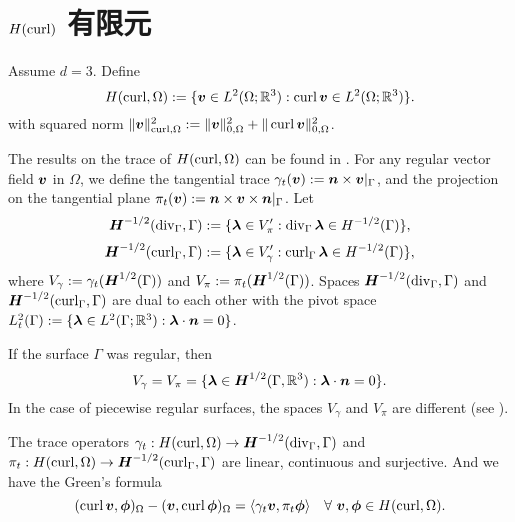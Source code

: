 \section{$H(\operatorname{curl})$ 有限元}

Assume $d=3$.
Define
\[
H(\operatorname{curl},\Omega):=\{\boldsymbol v\in L^2(\Omega;\mathbb R^3): \operatorname{curl}\boldsymbol v\in L^2(\Omega;\mathbb R^3)\}.
\]
with squared  norm $\|\boldsymbol v\|_{\operatorname{curl}, \Omega}^2:=\|\boldsymbol v\|_{0, \Omega}^2+\|\operatorname{curl}\boldsymbol v\|_{0, \Omega}^2$.

The results on the trace of $H(\operatorname{curl},\Omega)$ can be found in \cite{BuffaCostabelSheen2002,BuffaCiarlet2001,BuffaCiarlet2001a}.
 For any regular vector field $\boldsymbol v$ in $\Omega$, we define the tangential trace $\gamma_{t}(\boldsymbol v):=\boldsymbol n\times \boldsymbol v|_{\Gamma}$, and the projection on the tangential plane $\pi_{t}(\boldsymbol v):=\boldsymbol n\times\boldsymbol v\times  \boldsymbol n|_{\Gamma}$. Let
 \[
 \boldsymbol H^{-1/2}(\operatorname{div}_{\Gamma}, \Gamma):=\{\boldsymbol\lambda\in V_{\pi}': \operatorname{div}_{\Gamma}\boldsymbol\lambda\in H^{-1/2}(\Gamma)\},
 \]
 \[
 \boldsymbol H^{-1/2}(\operatorname{curl}_{\Gamma}, \Gamma):=\{\boldsymbol\lambda\in V_{\gamma}': \operatorname{curl}_{\Gamma}\boldsymbol\lambda\in H^{-1/2}(\Gamma)\},
 \]
 where $V_{\gamma}:=\gamma_{t}(\boldsymbol H^{1/2}(\Gamma))$ and $V_{\pi}:=\pi_{t}(\boldsymbol H^{1/2}(\Gamma))$.
Spaces $ \boldsymbol H^{-1/2}(\operatorname{div}_{\Gamma}, \Gamma)$ and $ \boldsymbol H^{-1/2}(\operatorname{curl}_{\Gamma}, \Gamma)$ are dual to each other with the pivot space $L_t^2(\Gamma):=\{\boldsymbol \lambda\in L^2(\Gamma;\mathbb R^3): \boldsymbol \lambda\cdot\boldsymbol n=0\}$.

If the surface $\Gamma$ was regular, then
\[
V_{\gamma}=V_{\pi}=\{\boldsymbol\lambda\in\boldsymbol H^{1/2}(\Gamma, \mathbb R^3): \boldsymbol\lambda\cdot\boldsymbol n=0\}.
\]
In the case of piecewise regular surfaces, the spaces $V_{\gamma}$ and $V_{\pi}$ are different (see \cite{BuffaCiarlet2001}).

\begin{lemma}
The trace operators $\gamma_{t}:  H(\operatorname{curl},\Omega)\to\boldsymbol H^{-1/2}(\operatorname{div}_{\Gamma}, \Gamma)$ and $\pi_{t}:  H(\operatorname{curl},\Omega)\to\boldsymbol H^{-1/2}(\operatorname{curl}_{\Gamma}, \Gamma)$ are linear, continuous and surjective. And we have the 
Green's formula
\[
(\operatorname{curl}\boldsymbol v, \boldsymbol\phi)_{\Omega} - (\boldsymbol v, \operatorname{curl}\boldsymbol\phi)_{\Omega}=\langle\gamma_t\boldsymbol v, \pi_t\boldsymbol \phi\rangle\quad\forall~\boldsymbol v, \boldsymbol \phi\in H(\operatorname{curl},\Omega).
\]
\end{lemma}

